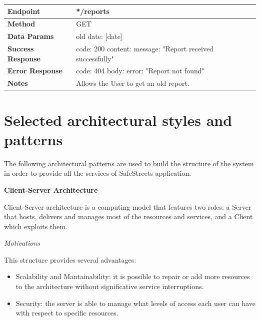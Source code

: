 \documentclass{report}
\begin{document}
    \begin{tabular}{| l | p{8cm} |}
        \hline
        \textbf{Endpoint} & */reports \\
        \hline
        \textbf{Method} & GET \\
        \hline
        \textbf{Data Params} & old date: [date]\\
        \hline
        \textbf{Success Response} &  code: 200 \newline content: {message: "Report received successfully"}\\
        \hline
        \textbf{Error Response} & code: 404 \newline body: {error: "Report not found"}\\
        \hline
        \textbf{Notes} & Allows the User to get an old report. \\
        \hline
    \end{tabular}
\clearpage

\section{Selected architectural	styles and patterns}
The following architectural patterns are used to build the structure of the system in order to provide all the services of SafeStreets application.\\

\begin{center}\large{\textbf{Client-Server Architecture}}\end{center}
Client-Server architecture is a computing model that features two roles: a Server that hosts, delivers and manages most of the resources and services, and a Client which exploits them.
\begin{center}\large{\textit{Motivations}}\end{center}
\noindent This structure provides several advantages:
\begin{itemize}
    \item Scalability and Mantainability: it is possible to repair or add more resources to the architecture without significative service interruptions.
    \item Security: the server is able to manage what levels of access each user can have with respect to specific resources.
\end{itemize}
\end{document}
